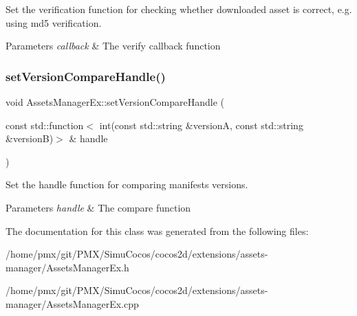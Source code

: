 Set the verification function for checking whether downloaded asset is correct, e.\+g. using md5 verification. 


\begin{DoxyParams}{Parameters}
{\em callback} & The verify callback function \\
\hline
\end{DoxyParams}
\mbox{\label{classAssetsManagerEx_a31db300c9b7b7c709f8a312646de5168}} 
\subsubsection{\texorpdfstring{set\+Version\+Compare\+Handle()}{setVersionCompareHandle()}}
{\footnotesize\ttfamily void Assets\+Manager\+Ex\+::set\+Version\+Compare\+Handle (\begin{DoxyParamCaption}\item[{const std\+::function$<$ int(const std\+::string \&versionA, const std\+::string \&versionB)$>$ \&}]{handle }\end{DoxyParamCaption})\hspace{0.3cm}{\ttfamily [inline]}}



Set the handle function for comparing manifests versions. 


\begin{DoxyParams}{Parameters}
{\em handle} & The compare function \\
\hline
\end{DoxyParams}


The documentation for this class was generated from the following files\+:\begin{DoxyCompactItemize}
\item 
/home/pmx/git/\+P\+M\+X/\+Simu\+Cocos/cocos2d/extensions/assets-\/manager/Assets\+Manager\+Ex.\+h\item 
/home/pmx/git/\+P\+M\+X/\+Simu\+Cocos/cocos2d/extensions/assets-\/manager/Assets\+Manager\+Ex.\+cpp\end{DoxyCompactItemize}
